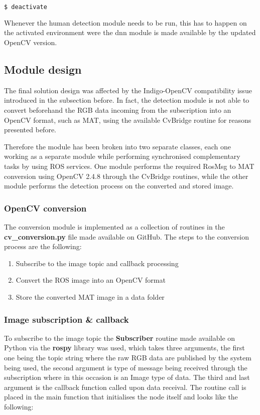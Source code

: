 \begin{lstlisting}[language=bash]
	$ deactivate
\end{lstlisting}

Whenever the human detection module needs to be run, this has to happen on the activated environment were the dnn module is made available by the updated OpenCV version.

\subsection{Module design}

The final solution design was affected by the Indigo-OpenCV compatibility issue introduced in the subsection before. In fact, the detection module is not able to convert beforehand the RGB data incoming from the subscription into an OpenCV format, such as MAT, using the available CvBridge routine for reasons presented before.

Therefore the module has been broken into two separate classes, each one working as a separate module while performing synchronised complementary tasks by using ROS services. One module performs the required RosMsg to MAT conversion using OpenCV 2.4.8 through the CvBridge routines, while the other module performs the detection process on the converted and stored image. 

\subsubsection{OpenCV conversion}

The conversion module is implemented as a collection of routines in the \textbf{cv\_conversion.py} file made available on GitHub. The steps to the conversion process are the following:

\begin{enumerate}
  \item Subscribe to the image topic and callback processing
  \item Convert the ROS image into an OpenCV format
  \item Store the converted MAT image in a data folder
\end{enumerate}

\subsubsection{Image subscription \& callback}

To subscribe to the image topic the \textbf{Subscriber} routine made available on Python via the \textbf{rospy} library was used, which takes three arguments, the first one being the topic string where the raw RGB data are published by the system being used, the second argument is type of message being received through the subscription where in this occasion is an Image type of data. The third and last argument is the callback function called upon data receival. The routine call is placed in the main function that initialises the node itself and looks like the following:

